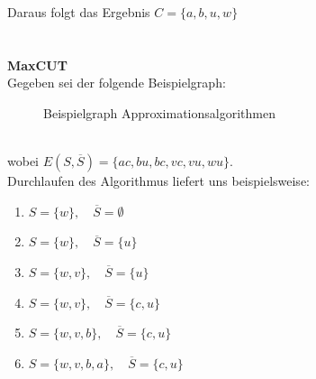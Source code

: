 \documentclass{article} %
\begin{document}
Daraus folgt das Ergebnis $C = \{a,b,u,w\}$\\
\\
\\
\textbf{MaxCUT}\\
Gegeben sei der folgende Beispielgraph:
\begin{figure}[!htp]
	\centering
	\caption{Beispielgraph Approximationsalgorithmen}
\end{figure}\\
wobei $E(S, \overline{S}) = \{ac, bu, bc, vc, vu, wu\}$.\\
Durchlaufen des Algorithmus liefert uns beispielsweise:
\begin{enumerate}[label=\textbf{\arabic*. Schritt}:, leftmargin=8em]
	\item $S = \{w\}, \quad \overline{S} = \emptyset$
	\item $S = \{w\}, \quad \overline{S} = \{u\}$
	\item $S = \{w, v\}, \quad \overline{S} = \{u\}$
	\item $S = \{w, v\}, \quad \overline{S} = \{c, u\}$
	\item $S = \{w, v, b\}, \quad \overline{S} = \{c, u\}$
	\item $S = \{w, v, b, a\}, \quad \overline{S} = \{c, u\}$
\end{enumerate}
\end{document}
